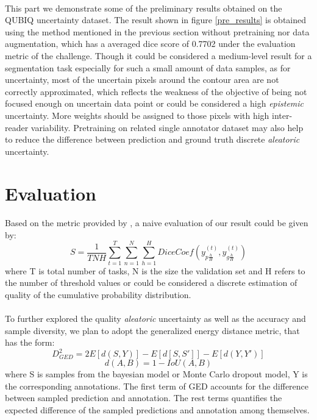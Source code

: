 \documentclass[12pt]{extarticle}
\begin{document}
\paragraph{}
This part we demonstrate some of the preliminary results obtained on the QUBIQ uncertainty dataset.
The result shown in figure \ref{pre_results} is obtained using the method mentioned in the previous 
section without pretraining nor data augmentation, which has 
a averaged dice score of 0.7702 under the evaluation metric of the challenge. 
Though it could be considered a medium-level result for a segmentation task especially for such
a small amount of data samples, as for uncertainty, most of the uncertain pixels around the contour area are not 
correctly approximated, which reflects the weakness of the objective of 
being not focused enough on uncertain data point or could be considered a high \textit{epistemic} uncertainty. 
More weights should be assigned to those pixels with high inter-reader variability. Pretraining on 
related single annotator dataset may also help to reduce the difference between 
prediction and ground truth discrete \textit{aleatoric} uncertainty.
\section{Evaluation}
\paragraph{}
Based on the metric provided by \cite{qubiq}, a naive evaluation of our result could be given by:
\begin{equation}
    S = \frac{1}{TNH}\sum_{t=1}^{T}\sum_{n=1}^{N}\sum_{h=1}^{H}DiceCoef(y_{p\frac{h}{H}}^{(t)}, y_{g\frac{h}{H}}^{(t)})
\end{equation}
where T is total number of tasks, N is the size the validation set and H refers to 
the number of threshold values or could be considered a discrete estimation of quality of the cumulative probability 
distribution.
\paragraph{}
To further explored the quality \textit{aleatoric} uncertainty as well as the accuracy and sample diversity, we plan to 
adopt the generalized energy distance metric, that has the form:
\begin{equation}
    D^2_{GED} = 2E[d(S, Y)] - E[d[S, S']] - E[d(Y, Y')]
\end{equation}
\begin{equation}
    d(A, B) = 1 - IoU(A, B)
\end{equation}
where S is samples from the bayesian model or Monte Carlo dropout model, Y is the corresponding 
annotations. The first term of GED accounts for the difference between sampled prediction
and annotation. The rest terms quantifies the expected difference of the sampled predictions and 
annotation among themselves. 
\end{document}
